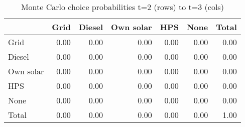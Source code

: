 \begin{table}[!ht]
	\centering
		\caption{Monte Carlo choice probabilities t=2 (rows) to t=3 (cols)}
\begin{tabular}{lrrrrrr}
		\toprule
               &      Grid&    Diesel& Own solar&       HPS&      None&     Total\\
		\midrule
		           Grid&      0.00&      0.00&      0.00&      0.00&      0.00&      0.00\\
		         Diesel&      0.00&      0.00&      0.00&      0.00&      0.00&      0.00\\
		      Own solar&      0.00&      0.00&      0.00&      0.00&      0.00&      0.00\\
		            HPS&      0.00&      0.00&      0.00&      0.00&      0.00&      0.00\\
		           None&      0.00&      0.00&      0.00&      0.00&      0.00&      0.00\\
		          Total&      0.00&      0.00&      0.00&      0.00&      0.00&      1.00\\
		\bottomrule
	\end{tabular}
\end{table}

